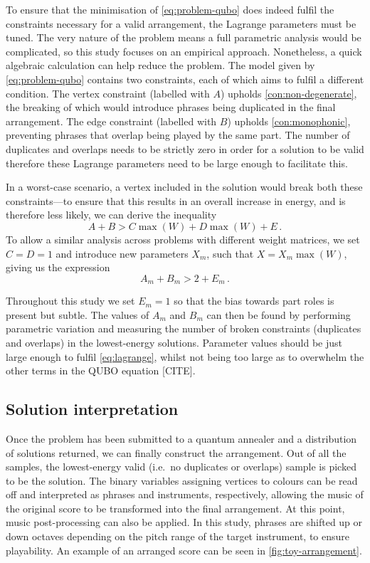 \documentclass[12pt]{article}
\theoremstyle{definition}
\begin{document}
To ensure that the minimisation of \cref{eq:problem-qubo} does indeed fulfil the constraints necessary for a valid arrangement, the Lagrange parameters must be tuned. The very nature of the problem means a full parametric analysis would be complicated, so this study focuses on an empirical approach.
Nonetheless, a quick algebraic calculation can help reduce the problem. The model given by \cref{eq:problem-qubo} contains two constraints, each of which aims to fulfil a different condition. The vertex constraint (labelled with $A$) upholds \cref{con:non-degenerate}, the breaking of which would introduce phrases being duplicated in the final arrangement. The edge constraint (labelled with $B$) upholds \cref{con:monophonic}, preventing phrases that overlap being played by the same part. The number of duplicates and overlaps needs to be strictly zero in order for a solution to be valid therefore these Lagrange parameters need to be large enough to facilitate this.

In a worst-case scenario, a vertex included in the solution would break both these constraints---to ensure that this results in an overall increase in energy, and is therefore less likely, we can derive the inequality
\begin{equation}
    A + B > C\max(W) + D\max(W) + E \,.
\end{equation}
To allow a similar analysis across problems with different weight matrices, we set ${C=D=1}$ and introduce new parameters $X_m$, such that ${X = X_m\max(W)}$, giving us the expression
\begin{equation}
    A_m + B_m > 2 + E_m \,.
    \label{eq:lagrange}
\end{equation}

Throughout this study we set $E_m=1$ so that the bias towards part roles is present but subtle. The values of $A_m$ and $B_m$ can then be found by performing parametric variation and measuring the number of broken constraints (duplicates and overlaps) in the lowest-energy solutions. Parameter values should be just large enough to fulfil \cref{eq:lagrange}, whilst not being too large as to overwhelm the other terms in the QUBO equation [CITE].

\subsection{Solution interpretation}

Once the problem has been submitted to a quantum annealer and a distribution of solutions returned, we can finally construct the arrangement. Out of all the samples, the lowest-energy valid (i.e.\ no duplicates or overlaps) sample is picked to be the solution. The binary variables assigning vertices to colours can be read off and interpreted as phrases and instruments, respectively, allowing the music of the original score to be transformed into the final arrangement.
At this point, music post-processing can also be applied. In this study, phrases are shifted up or down octaves depending on the pitch range of the target instrument, to ensure playability. An example of an arranged score can be seen in \cref{fig:toy-arrangement}.
\end{document}

